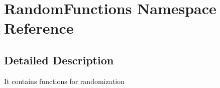 \hypertarget{namespace_random_functions}{\section{Random\-Functions Namespace Reference}
\label{namespace_random_functions}
}


\subsection{Detailed Description}
It contains functions for randomization 